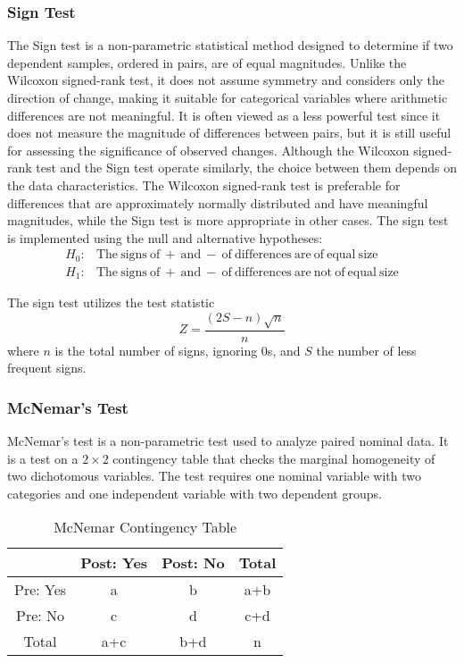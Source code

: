 \subsubsection{Sign Test}
\hfill \break
The Sign test is a non-parametric statistical method designed to determine if two dependent samples, ordered in pairs, are of equal magnitudes. Unlike the Wilcoxon signed-rank test, it does not assume symmetry and considers only the direction of change, making it suitable for categorical variables where arithmetic differences are not meaningful. It is often viewed as a less powerful test since it does not measure the magnitude of differences between pairs, but it is still useful for assessing the significance of observed changes. Although the Wilcoxon signed-rank test and the Sign test operate similarly, the choice between them depends on the data characteristics. The Wilcoxon signed-rank test is preferable for differences that are approximately normally distributed and have meaningful magnitudes, while the Sign test is more appropriate in other cases. The sign test is implemented using the null and alternative hypotheses:
\begin{equation}
\begin{array}{rl}
    H_0 : & \mathrm{The\ signs\ of\ +\ and\ -\ of\ differences\ are\ of\ equal\ size} \\
    H_1 : & \mathrm{The\ signs\ of\ +\ and\ -\ of\ differences\ are\ not\ of\ equal\ size}
\end{array}
\end{equation}

The sign test utilizes the test statistic
\begin{equation}
    Z = \frac{(2S - n)\sqrt{n}}{n}
\end{equation}
where $n$ is the total number of signs, ignoring 0s, and $S$ the number of less frequent signs.

\subsubsection{McNemar's Test}
\hfill \break
McNemar's test is a non-parametric test used to analyze paired nominal data. It is a test on a $2\times 2$ contingency table that checks the marginal homogeneity of two dichotomous variables. The test requires one nominal variable with two categories and one independent variable with two dependent groups.

\begin{table}[ht]
\centering
\begin{tabular}{ |c|c|c|c| } 
    \hline
     & Post: Yes & Post: No & Total \\
    \hline
    Pre: Yes & a & b & a+b \\ 
    Pre: No & c & d & c+d \\
    Total & a+c & b+d & n \\
    \hline
\end{tabular}
\caption{McNemar Contingency Table}
\label{tab:mcnemar}
\end{table}

